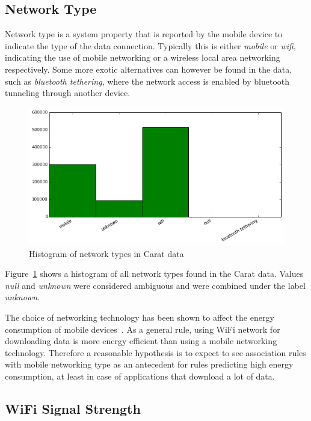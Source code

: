 \subsection{Network Type}  

Network type is a system property that is reported by the mobile device to indicate the type of the data connection. Typically this is either \textit{mobile} or \textit{wifi}, indicating the use of mobile networking or a wireless local area networking respectively. Some more exotic alternatives can however be found in the data, such as \textit{bluetooth tethering}, where the network access is enabled by bluetooth tunneling through another device.

\begin{figure} %
	\centering
	\includegraphics[width=\textwidth]{images/carat-data/network_type.png}
	\caption{Histogram of network types in Carat data}
	\label{figure:carat-data-net-type}
\end{figure}   

Figure~\ref{figure:carat-data-net-type} shows a histogram of all network types found in the Carat data. Values \textit{null} and \textit{unknown} were considered ambiguous and were combined under the label \textit{unknown}.
 
The choice of networking technology has been shown to affect the energy consumption of mobile devices~\cite{7146507, 6240745}. As a general rule, using WiFi network for downloading data is more energy efficient than using a mobile networking technology. Therefore a reasonable hypothesis is to expect to see association rules with mobile networking type as an antecedent for rules predicting high energy consumption, at least in case of applications that download a lot of data.  

\subsection{WiFi Signal Strength}

